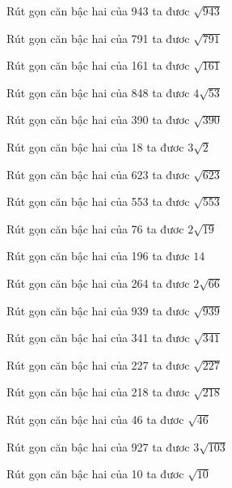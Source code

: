 \documentclass[12pt,a4paper]{article}
\begin{document}
\begin{ex}
Rút gọn căn bậc hai của 943 ta đươc $\sqrt{943}$
\end{ex}
\begin{ex}
Rút gọn căn bậc hai của 791 ta đươc $\sqrt{791}$
\end{ex}
\begin{ex}
Rút gọn căn bậc hai của 161 ta đươc $\sqrt{161}$
\end{ex}
\begin{ex}
Rút gọn căn bậc hai của 848 ta đươc $4\sqrt{53}$
\end{ex}
\begin{ex}
Rút gọn căn bậc hai của 390 ta đươc $\sqrt{390}$
\end{ex}
\begin{ex}
Rút gọn căn bậc hai của 18 ta đươc $3\sqrt{2}$
\end{ex}
\begin{ex}
Rút gọn căn bậc hai của 623 ta đươc $\sqrt{623}$
\end{ex}
\begin{ex}
Rút gọn căn bậc hai của 553 ta đươc $\sqrt{553}$
\end{ex}
\begin{ex}
Rút gọn căn bậc hai của 76 ta đươc $2\sqrt{19}$
\end{ex}
\begin{ex}
Rút gọn căn bậc hai của 196 ta đươc $14$
\end{ex}
\begin{ex}
Rút gọn căn bậc hai của 264 ta đươc $2\sqrt{66}$
\end{ex}
\begin{ex}
Rút gọn căn bậc hai của 939 ta đươc $\sqrt{939}$
\end{ex}
\begin{ex}
Rút gọn căn bậc hai của 341 ta đươc $\sqrt{341}$
\end{ex}
\begin{ex}
Rút gọn căn bậc hai của 227 ta đươc $\sqrt{227}$
\end{ex}
\begin{ex}
Rút gọn căn bậc hai của 218 ta đươc $\sqrt{218}$
\end{ex}
\begin{ex}
Rút gọn căn bậc hai của 46 ta đươc $\sqrt{46}$
\end{ex}
\begin{ex}
Rút gọn căn bậc hai của 927 ta đươc $3\sqrt{103}$
\end{ex}
\begin{ex}
Rút gọn căn bậc hai của 10 ta đươc $\sqrt{10}$
\end{ex}
\end{document}
